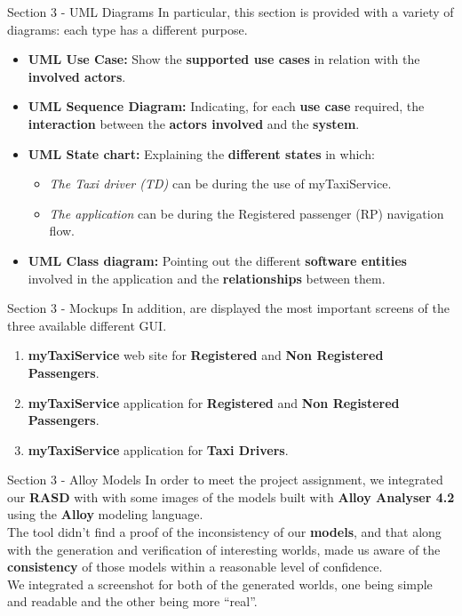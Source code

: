 \documentclass{../common/latex_classes/pdf_presentation}
\begin{document}
	\begin{frame}{Section 3 - UML Diagrams}
		In particular, this section is provided with a variety of diagrams: each type has a different purpose.\\
		\begin{itemize}
			\item\textbf{UML Use Case:} Show the \textbf{supported use cases} in relation with the \textbf{involved actors}.
			\item\textbf{UML Sequence Diagram:} Indicating, for each \textbf{use case} required, the \textbf{interaction} between the \textbf{actors involved} and the \textbf{system}.
			\item\textbf{UML State chart:} Explaining the \textbf{different states} in which:\\
			\begin{itemize}
				\item\textit{The Taxi driver (TD)} can be during the use of myTaxiService.
				\item\textit{The application} can be during the Registered passenger (RP) navigation flow.
			\end{itemize}
			\item\textbf{UML Class diagram:} Pointing out the different \textbf{software entities} involved in the application and the \textbf{relationships} between them.
		\end{itemize}
	\end{frame}
	\begin{frame}{Section 3 - Mockups}
		In addition, are displayed the most important screens of the three available different GUI.
		\begin{enumerate}
			\item \textbf{myTaxiService} web site for \textbf{Registered} and \textbf{Non Registered Passengers}.
			\item \textbf{myTaxiService} application for \textbf{Registered} and \textbf{Non Registered Passengers}.
			\item \textbf{myTaxiService} application for \textbf{Taxi Drivers}.
		\end{enumerate}
	\end{frame}
	\begin{frame}{Section 3 - Alloy Models}
		In order to meet the project assignment, we integrated our \textbf{RASD} with with some images of the models built with \textbf{Alloy Analyser 4.2} using the \textbf{Alloy} modeling language.\\
		The tool didn't find a proof of the inconsistency of our \textbf{models}, and that along with the generation and verification of interesting worlds, made us aware of the \textbf{consistency} of those models within a reasonable level of confidence.\\
		We integrated a screenshot for both of the generated worlds, one being simple and readable and the other being more “real”.
	\end{frame}
\end{document}
